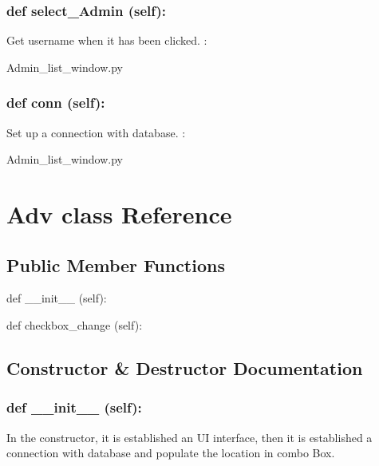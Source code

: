 \hypertarget{class_poly_a14a7ad77ce612b0c54f531d307ee4b39}{
\subsubsection[{def select_Admin (self):}]{\setlength{\rightskip}{0pt plus 5cm}def {select\_Admin} (self):}}\label{class_poly_a14a7ad77ce612b0c54f531d307ee4b39}
Get username when it has been clicked. 
:\begin{DoxyCompactItemize}
\item 
Admin\_list\_window.\-py\end{DoxyCompactItemize}

\hypertarget{class_poly_a14a7ad77ce612b0c54f531d307ee4b39}{
\subsubsection[{def conn (self):}]{\setlength{\rightskip}{0pt plus 5cm}def {conn} (self):}}\label{class_poly_a14a7ad77ce612b0c54f531d307ee4b39}
Set up a connection with database.
:\begin{DoxyCompactItemize}
\item 
Admin\_list\_window.\-py\end{DoxyCompactItemize}


\hypertarget{Adv_class}{\section{Adv class Reference}
\label{Adv_class}
}
\subsection*{Public Member Functions}
\begin{DoxyCompactItemize}
\item 
def {\_\_init\_\_} (self):
\item 
def {checkbox\_change} (self):

\end{DoxyCompactItemize}

\subsection{Constructor \& Destructor Documentation}
\hypertarget{class_poly_aa3def076b74bed67904976ad4f9fe9b1}{
\subsubsection[{def __init__ (self):}]{\setlength{\rightskip}{0pt plus 5cm}def {\_\_init\_\_} (self): 
}}
In the constructor, it is established an UI interface, then it is  established a connection with database and populate the location in combo Box.
 


